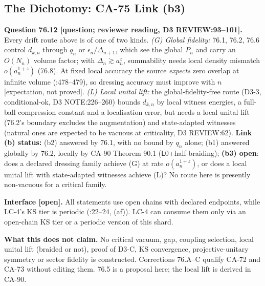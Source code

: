\subsection{The Dichotomy: CA-75 Link (b3)}

\textbf{Question 76.12 [question; reviewer reading, D3 REVIEW:93--101].}  Every drift route above is of one of two kinds.
\emph{(G) Global fidelity:} 76.1, 76.2, 76.6 control \(d_{k,n}\) through \(q_n\) or \(\epsilon_n/\Delta_{n+1}\), which
see the global \(P_n\) and carry an \(O(N_n)\) volume factor; with \(\Delta_n\gtrsim a_n^z\), summability needs local
density mismatch \(o(a_n^{1+z})\) (76.8).  At fixed local accuracy the source \emph{expects} zero overlap at infinite
volume (:478--479), so dressing accuracy must improve with \(n\) [expectation, not proved].
\emph{(L) Local unital lift:} the global-fidelity-free route (D3-3, conditional-ok, D3 NOTE:226--260) bounds
\(d_{k,n}\) by local witness energies, a full-ball compression constant and a localisation error, but needs a local
unital lift (76.2's boundary excludes the augmentation) and state-adapted witnesses (natural ones are expected to be
vacuous at criticality, D3 REVIEW:62).  \textbf{Link (b) status:} (b2) answered by 76.1, with no bound by \(q_n\)
alone; (b1) answered globally by 76.2, locally by CA-90 Theorem 90.1 (\(\mathsf L0\)+half-braiding); \textbf{(b3) open}: does a declared dressing family
achieve (G) at rate \(o(a_n^{1+z})\), or does a local unital lift with state-adapted witnesses achieve (L)?  No route
here is presently non-vacuous for a critical family.

\textbf{Interface [open].}  All statements use open chains with declared endpoints, while LC-4's KS tier is periodic
(:22--24, (af)).  LC-4 can consume them only via an open-chain KS tier or a
periodic version of this shard.

\textbf{What this does not claim.}  No critical vacuum, gap, coupling selection, local unital lift (braided or not),
proof of D3-C, KS convergence, projective-unitary symmetry or sector fidelity is constructed.  Corrections 76.A--C
qualify CA-72 and CA-73 without editing them.  76.5 is a proposal here; the local lift is derived in CA-90.

